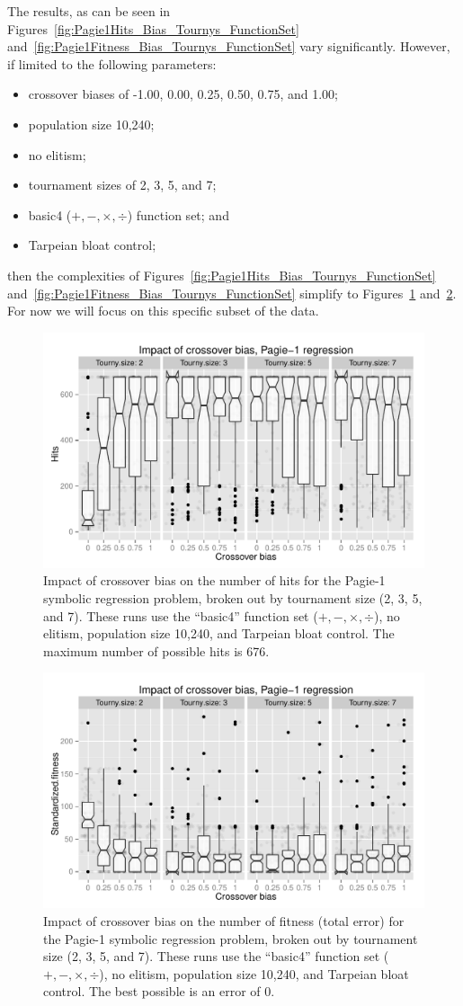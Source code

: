 \documentclass{sig-alternate}
\begin{document}
The results, as can be seen in Figures~\ref{fig:Pagie1Hits_Bias_Tournys_FunctionSet}
and~\ref{fig:Pagie1Fitness_Bias_Tournys_FunctionSet} vary significantly. However, if limited to the following
parameters:
\begin{itemize}
    \item crossover biases of -1.00, 0.00, 0.25, 0.50, 0.75, and 1.00;
    \item population size 10,240;
    \item no elitism;
    \item tournament sizes of 2, 3, 5, and 7;
	\item basic4 ($+, -, \times, \div$) function set; and
	\item Tarpeian bloat control;
\end{itemize}
then the complexities of Figures~\ref{fig:Pagie1Hits_Bias_Tournys_FunctionSet}
and~\ref{fig:Pagie1Fitness_Bias_Tournys_FunctionSet} simplify to
Figures~\ref{fig:Pagie1StrongHits_Bias_Tournys_FunctionSet} and~\ref{fig:Pagie1StrongFitness_Bias_Tournys_FunctionSet}.
For now we will focus on this specific subset of the data.

\begin{figure}
\centering
\includegraphics[width=0.45 \textwidth]{Plots/Pagie_1_strong_Hits_vs_Bias_Tournys_FunctionSet.pdf}
\caption{Impact of crossover bias on the number of hits for the Pagie-1 symbolic regression problem, broken out by 
tournament size (2, 3, 5, and 7). These runs use the ``basic4'' function set ($+, -, \times, \div$), no elitism, 
population size 10,240, and Tarpeian bloat control. The maximum number of possible hits is 676.}
\label{fig:Pagie1StrongHits_Bias_Tournys_FunctionSet}
\end{figure}

\begin{figure}
\centering
\includegraphics[width=0.45 \textwidth]{Plots/Pagie_1_strong_Fitness_vs_Bias_Tournys_FunctionSet.pdf}
\caption{Impact of crossover bias on the number of fitness (total error) for the Pagie-1 symbolic regression problem, 
broken out by tournament size (2, 3, 5, and 7). These runs use the ``basic4'' function set ($+, -, \times, \div$), no 
elitism, population size 10,240, and Tarpeian bloat control. The best possible is an error of 0.}
\label{fig:Pagie1StrongFitness_Bias_Tournys_FunctionSet}
\end{figure}
\end{document}
